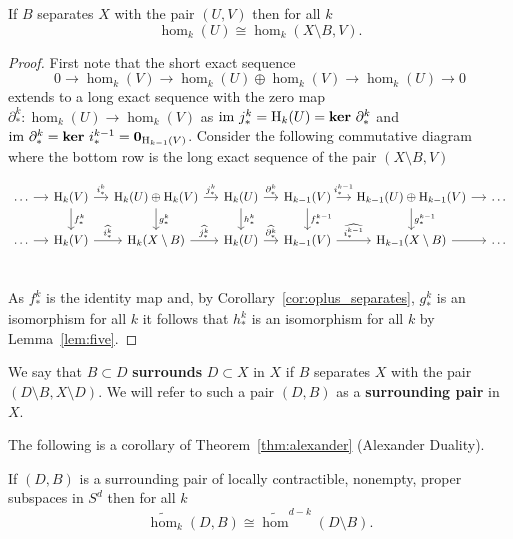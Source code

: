 \begin{lemma}\label{lem:iso_separates}
  If $B$ separates $X$ with the pair $(U, V)$ then for all $k$
  \[ \hom_k(U)\cong \hom_k(X\setminus B, V).\]
\end{lemma}
\begin{proof}
  First note that the short exact sequence
  \[ 0\to \hom_k(V)\to \hom_k(U)\oplus\hom_k(V)\to \hom_k(U)\to 0\]
  extends to a long exact sequence with the zero map $\partial_*^k : \hom_k(U)\to \hom_k(V)$ as $\mathrm{im}~j^k_* = \mathrm{H}_k(U) = \mathbf{ker}~\partial_*^k$ and $\mathrm{im}~\partial_*^k = \mathbf{ker}~ i^{k-1}_* = \mathbf{0}_{\mathrm{H}_{k-1}(V)}$.
  Consider the following commutative diagram where the bottom row is the long exact sequence of the pair $(X\setminus B, V)$
  \begin{small}
  \[\begin{tikzcd}[column sep=small]
    \ldots\ar[r]  & \hom_k(V)\ar[r, "i_*^k"]\ar[d, "f_*^k"]
                  & \hom_k(U)\oplus\hom_k(V)\ar[r, "j_*^k"]\ar[d, "g_*^k"]
                  & \hom_k(U)\ar[r, "\partial_*^k"]\ar[d, "h_*^k"]
                  & \hom_{k-1}(V)\ar[r, "i_*^{k-1}"]\ar[d, "f_*^{k-1}"]
                  & \hom_{k-1}(U)\oplus\hom_{k-1}(V)\ar[r]\ar[d, "g_*^{k-1}"]
                  & \ldots\\
    \ldots\ar[r]  & \hom_k(V)\ar[r, "\widehat{i_*^k}"]
                  & \hom_k(X\setminus B)\ar[r, "\widehat{j_*^k}"]
                  & \hom_k(U)\ar[r, "\widehat{\partial_*^k}"]
                  & \hom_{k-1}(V)\ar[r, "\widehat{i_*^{k-1}}"]
                  & \hom_{k-1}(X\setminus B)\ar[r]
                  & \ldots\\
  \end{tikzcd}\]
  \end{small}
  As $f_*^k$ is the identity map and, by Corollary~\ref{cor:oplus_separates}, $g^k_*$ is an isomorphism for all $k$ it follows that $h_*^k$ is an isomorphism for all $k$ by Lemma~\ref{lem:five}.
\end{proof}

\begin{definition}[Surrounding]
  We say that $B\subset D$ \textbf{surrounds} $D\subset X$ in $X$ if $B$ separates $X$ with the pair $(D\setminus B, X\setminus D)$.
  We will refer to such a pair $(D, B)$ as a \textbf{surrounding pair} in $X$.
\end{definition}

The following is a corollary of Theorem~\ref{thm:alexander} (Alexander Duality).

\begin{corollary}\label{cor:alexander_surrounds}
  If $(D,B)$ is a surrounding pair of locally contractible, nonempty, proper subspaces in $S^d$ then for all $k$
  \[ \tilde{\hom}_k(D, B) \cong \tilde{\hom}^{d-k}(D\setminus B). \]
\end{corollary}

